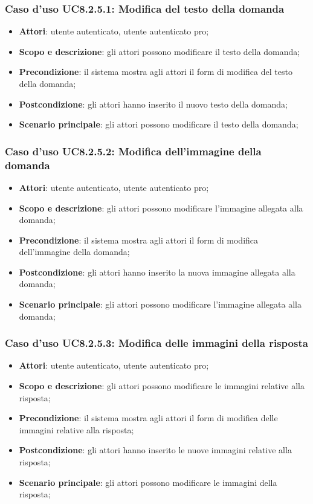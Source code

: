 \subsubsection{Caso d’uso UC8.2.5.1: Modifica del testo della domanda}
\begin{itemize}
	\item\textbf{Attori}: utente autenticato, utente autenticato pro;
	\item\textbf{Scopo e descrizione}: gli attori possono modificare il testo della domanda;
	\item\textbf{Precondizione}: il sistema mostra agli attori il form di modifica del testo della domanda; 
	\item \textbf{Postcondizione}: gli attori hanno inserito il nuovo testo della domanda;
	\item\textbf{Scenario principale}: gli attori possono modificare il testo della domanda;
\end{itemize}

\subsubsection{Caso d’uso UC8.2.5.2: Modifica dell'immagine della domanda}
\begin{itemize}
	\item\textbf{Attori}: utente autenticato, utente autenticato pro;
	\item\textbf{Scopo e descrizione}: gli attori possono modificare l'immagine allegata alla domanda;
	\item\textbf{Precondizione}: il sistema mostra agli attori il form di modifica dell'immagine della domanda; 
	\item \textbf{Postcondizione}: gli attori hanno inserito la nuova immagine allegata alla domanda;
	\item\textbf{Scenario principale}: gli attori possono modificare l'immagine allegata alla domanda;
\end{itemize}

\subsubsection{Caso d’uso UC8.2.5.3: Modifica delle immagini della risposta}
\begin{itemize}
	\item\textbf{Attori}: utente autenticato, utente autenticato pro;
	\item\textbf{Scopo e descrizione}: gli attori possono modificare le immagini relative alla risposta;
	\item\textbf{Precondizione}: il sistema mostra agli attori il form di modifica delle immagini relative alla risposta; 
	\item \textbf{Postcondizione}: gli attori hanno inserito le nuove immagini relative alla risposta;
	\item\textbf{Scenario principale}: gli attori possono modificare le immagini della risposta;
\end{itemize}

